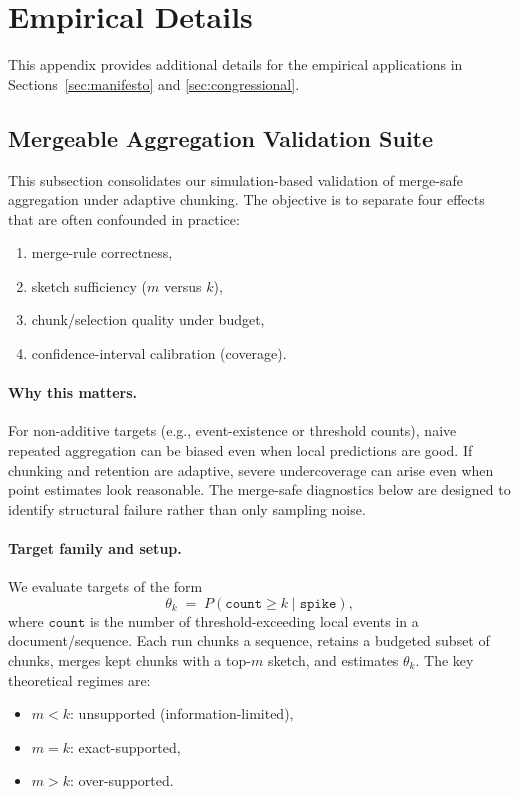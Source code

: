 \section{Empirical Details}\label{app:empirical}

This appendix provides additional details for the empirical applications in Sections~\ref{sec:manifesto} and \ref{sec:congressional}.

\subsection{Mergeable Aggregation Validation Suite}\label{app:mergeable-validation}

This subsection consolidates our simulation-based validation of merge-safe aggregation under adaptive chunking.
The objective is to separate four effects that are often confounded in practice:
\begin{enumerate}[nosep]
    \item merge-rule correctness,
    \item sketch sufficiency (\(m\) versus \(k\)),
    \item chunk/selection quality under budget,
    \item confidence-interval calibration (coverage).
\end{enumerate}

\paragraph{Why this matters.}
For non-additive targets (e.g., event-existence or threshold counts), naive repeated aggregation can be biased even when local predictions are good.
If chunking and retention are adaptive, severe undercoverage can arise even when point estimates look reasonable.
The merge-safe diagnostics below are designed to identify structural failure rather than only sampling noise.

\paragraph{Target family and setup.}
We evaluate targets of the form
\[
\theta_k \;=\; P(\texttt{count}\ge k \mid \texttt{spike}),
\]
where \(\texttt{count}\) is the number of threshold-exceeding local events in a document/sequence.
Each run chunks a sequence, retains a budgeted subset of chunks, merges kept chunks with a top-\(m\) sketch, and estimates \(\theta_k\).
The key theoretical regimes are:
\begin{itemize}[nosep]
    \item \(m<k\): unsupported (information-limited),
    \item \(m=k\): exact-supported,
    \item \(m>k\): over-supported.
\end{itemize}


